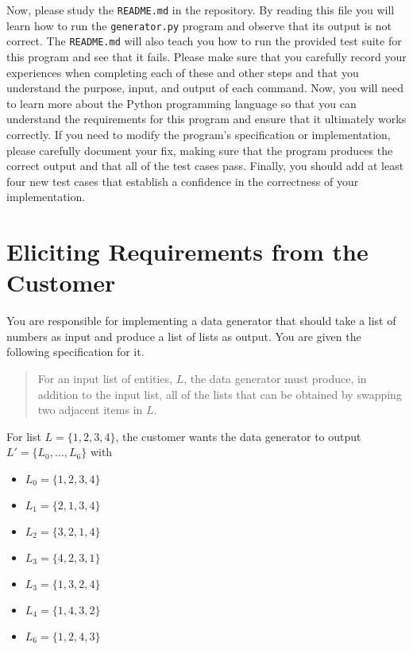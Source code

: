 \documentclass[11pt]{article}
\newcommand{\mainprogram}{\lstinline{generator.py}}
\newcommand{\reflection}{\lstinline{README.md}}
\begin{document}
Now, please study the \reflection{} in the repository. By reading this file you will learn how to run the \mainprogram{}
program and observe that its output is not correct. The \reflection{} will also teach you how to run the provided test
suite for this program and see that it fails. Please make sure that you carefully record your experiences when
completing each of these and other steps and that you understand the purpose, input, and output of each command. Now,
you will need to learn more about the Python programming language so that you can understand the requirements for this
program and ensure that it ultimately works correctly. If you need to modify the program's specification or
implementation, please carefully document your fix, making sure that the program produces the correct output and that
all of the test cases pass. Finally, you should add at least four new test cases that establish a confidence in the
correctness of your implementation.

\section*{Eliciting Requirements from the Customer}

You are responsible for implementing a data generator that should take a list of numbers as input and produce a list of
lists as output. You are given the following specification for it.

\begin{quote}

For an input list of entities, $L$, the data generator must produce, in addition to the input list, all of the lists
that can be obtained by swapping two adjacent items in $L$.

\end{quote}

\noindent
For list $L = \{1, 2, 3, 4\}$, the customer wants the data generator to output $L'=\{L_0, \ldots, L_6\}$ with

\begin{itemize}
  \itemsep 0in
  \item[] $L_0 = \{1, 2, 3, 4\}$
  \item[] $L_1 = \{2, 1, 3, 4\}$
  \item[] $L_2 = \{3, 2, 1, 4\}$
  \item[] $L_3 = \{4, 2, 3, 1\}$
  \item[] $L_3 = \{1, 3, 2, 4\}$
  \item[] $L_4 = \{1, 4, 3, 2\}$
  \item[] $L_6 = \{1, 2, 4, 3\}$
\end{itemize}
\end{document}
